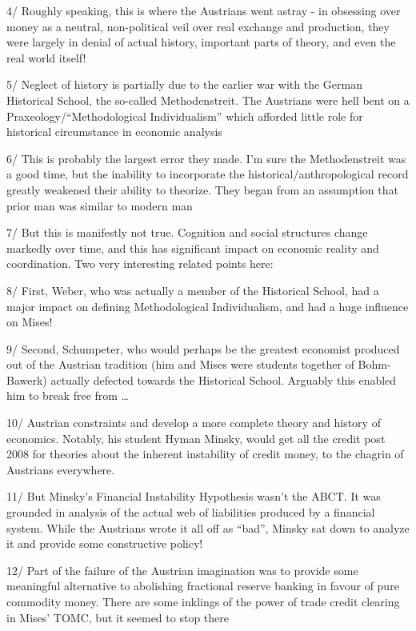 \documentclass[
]{book}
\begin{document}
4/ Roughly speaking, this is where the Austrians went astray - in obsessing over money as a neutral, non-political veil over real exchange and production, they were largely in denial of actual history, important parts of theory, and even the real world itself!

5/ Neglect of history is partially due to the earlier war with the German Historical School, the so-called Methodenstreit. The Austrians were hell bent on a Praxeology/``Methodological Individualism'' which afforded little role for historical circumstance in economic analysis

6/ This is probably the largest error they made. I'm sure the Methodenstreit was a good time, but the inability to incorporate the historical/anthropological record greatly weakened their ability to theorize. They began from an assumption that prior man was similar to modern man

7/ But this is manifestly not true. Cognition and social structures change markedly over time, and this has significant impact on economic reality and coordination. Two very interesting related points here:

8/ First, Weber, who was actually a member of the Historical School, had a major impact on defining Methodological Individualism, and had a huge influence on Mises!

9/ Second, Schumpeter, who would perhaps be the greatest economist produced out of the Austrian tradition (him and Mises were students together of Bohm-Bawerk) actually defected towards the Historical School. Arguably this enabled him to break free from \ldots{}

10/ Austrian constraints and develop a more complete theory and history of economics. Notably, his student Hyman Minsky, would get all the credit post 2008 for theories about the inherent instability of credit money, to the chagrin of Austrians everywhere.

11/ But Minsky's Financial Instability Hypothesis wasn't the ABCT. It was grounded in analysis of the actual web of liabilities produced by a financial system. While the Austrians wrote it all off as ``bad'', Minsky sat down to analyze it and provide some constructive policy!

12/ Part of the failure of the Austrian imagination was to provide some meaningful alternative to abolishing fractional reserve banking in favour of pure commodity money. There are some inklings of the power of trade credit clearing in Mises' TOMC, but it seemed to stop there
\end{document}
